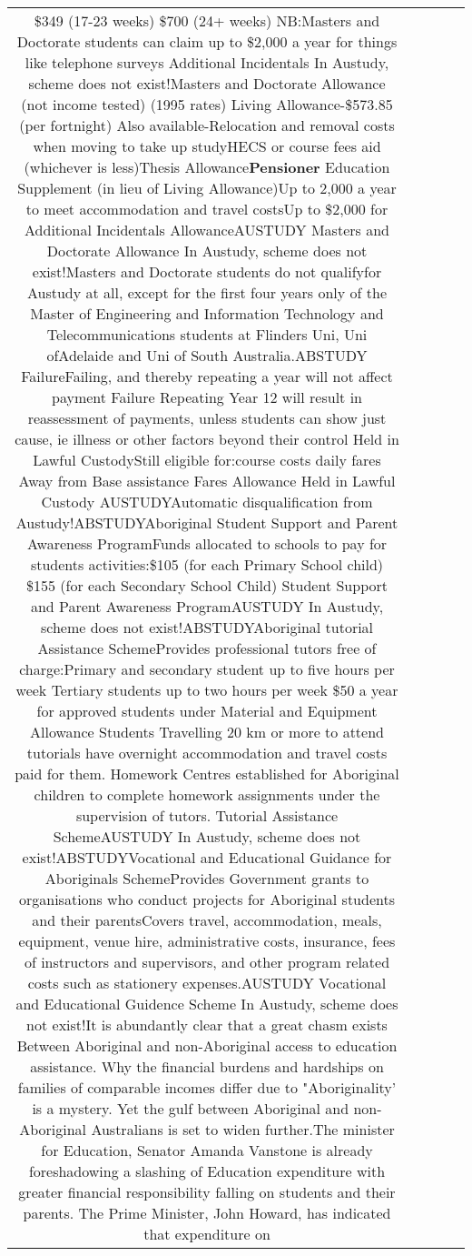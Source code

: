 \documentclass[11pt]{article}
\newlength\mylength
\begin{document}
\begin{center}
\begin{longtable}{|C{.65\mylength}|C{.30\mylength}|C{.12\mylength}|C{.12\mylength}|C{.12\mylength}|}
\$349 (17-23 weeks) \$700 (24+ weeks) NB:Masters and Doctorate students can claim up to \$2,000 a year for things like telephone surveys Additional Incidentals In Austudy, scheme does not exist!Masters and Doctorate Allowance (not income tested) (1995 rates) Living Allowance-\$573.85 (per fortnight) Also available-Relocation and removal costs when moving to take up studyHECS or course fees aid (whichever is less)Thesis Allowance\textbf{Pensioner} Education Supplement (in lieu of Living Allowance)Up to 2,000 a year to meet accommodation and travel costsUp to \$2,000 for Additional Incidentals AllowanceAUSTUDY Masters and Doctorate Allowance In Austudy, scheme does not exist!Masters and Doctorate students do not qualifyfor Austudy at all, except for the first four years only of the Master of Engineering and Information Technology and Telecommunications students at Flinders Uni, Uni ofAdelaide and Uni of South Australia.ABSTUDY FailureFailing, and thereby repeating a year will not affect payment Failure Repeating Year 12 will result in reassessment of payments, unless students can show just cause, ie illness or other factors beyond their control Held in Lawful CustodyStill eligible for:course costs daily fares Away from Base assistance Fares Allowance Held in Lawful Custody AUSTUDYAutomatic disqualification from Austudy!ABSTUDYAboriginal Student Support and Parent Awareness ProgramFunds allocated to schools to pay for students activities:\$105 (for each Primary School child) \$155 (for each Secondary School Child) Student Support and Parent Awareness ProgramAUSTUDY In Austudy, scheme does not exist!ABSTUDYAboriginal tutorial Assistance SchemeProvides professional tutors free of charge:Primary and secondary student up to five hours per week Tertiary students up to two hours per week \$50 a year for approved students under Material and Equipment Allowance Students Travelling 20 km or more to attend tutorials have overnight accommodation and travel costs paid for them. Homework Centres established for Aboriginal children to complete homework assignments under the supervision of tutors. Tutorial Assistance SchemeAUSTUDY In Austudy, scheme does not exist!ABSTUDYVocational and Educational Guidance for Aboriginals SchemeProvides Government grants to organisations who conduct projects for Aboriginal students and their parentsCovers travel, accommodation, meals, equipment, venue hire, administrative costs, insurance, fees of instructors and supervisors, and other program related costs such as stationery expenses.AUSTUDY Vocational and Educational Guidence Scheme In Austudy, scheme does not exist!It is abundantly clear that a great chasm exists Between Aboriginal and non-Aboriginal access to education assistance. Why the financial burdens and hardships on families of comparable incomes differ due to "Aboriginality' is a mystery. Yet the gulf between Aboriginal and non-Aboriginal Australians is set to widen further.The minister for Education, Senator Amanda Vanstone is already foreshadowing a slashing of Education expenditure with greater financial responsibility falling on students and their parents. The Prime Minister, John Howard, has indicated that expenditure on 
\end{longtable}
\end{center}
\end{document}
